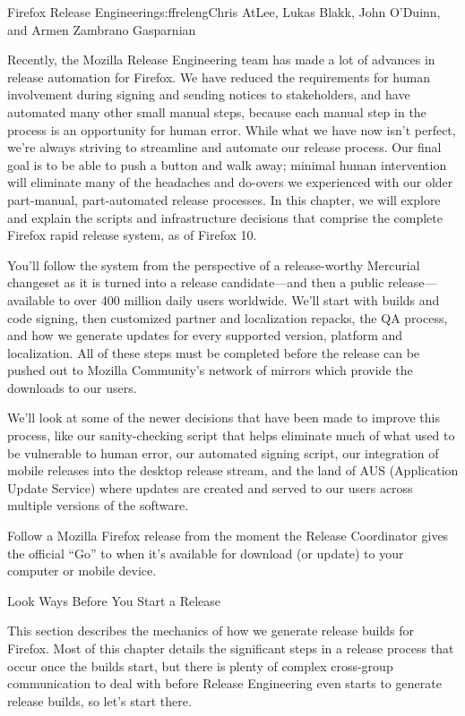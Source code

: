 \begin{aosachapter}{Firefox Release Engineering}{s:ffreleng}{Chris AtLee, Lukas Blakk, John O'Duinn, and Armen Zambrano Gasparnian}

Recently, the Mozilla Release Engineering team has made a lot of advances
in release automation for Firefox. We have
reduced the requirements for human involvement during signing and sending
notices to stakeholders, and have automated
many other small manual steps, because each manual step in the process is an
opportunity for human error. While what we have now isn't perfect,
we're always striving to streamline and automate our release
process. Our final goal is to be able to push a button and walk away;
minimal human intervention will eliminate many of the
headaches and do-overs we experienced with our older part-manual,
part-automated release processes. In this chapter, we will explore and
explain the scripts and infrastructure decisions that comprise
the complete Firefox rapid release system, as of Firefox 10.

You'll follow the system from the perspective of a release-worthy
Mercurial changeset as it is turned into a release candidate---and
then a public release---available to over 400 million daily users
worldwide.  We'll start with builds and code signing, then customized
partner and localization repacks, the QA process, and how we generate
updates for every supported version, platform and localization. All of
these steps must be completed before the release can be pushed out to
Mozilla Community's network of mirrors which provide the downloads to
our users.

We'll look at some of the newer decisions that have been made to
improve this process, like our sanity-checking script that helps
eliminate much of what used to be vulnerable to human error, our
automated signing script, our integration of mobile releases into the
desktop release stream, and the land of AUS (Application Update Service) where updates are
created and served to our users across multiple versions of the
software.

Follow a Mozilla Firefox release from the moment the Release
Coordinator gives the official ``Go'' to when it's available for
download (or update) to your computer or mobile device.

\begin{aosasect1}{Look  Ways Before You Start a Release}

This section describes the mechanics of how we generate release builds
for Firefox. Most of this chapter details the significant
steps in a release process that occur once the builds start, but
there is plenty of complex cross-group communication to deal
with before Release Engineering even starts to generate release
builds, so let's start there.


\end{aosasect1}
\end{aosachapter}
